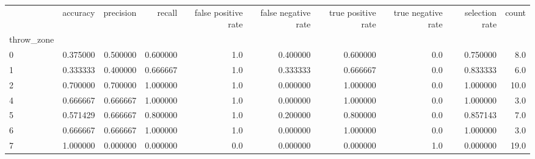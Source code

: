\begin{tabular}{lrrrrrrrrr}
\toprule
{} &  accuracy &  precision &    recall &  false positive rate &  false negative rate &  true positive rate &  true negative rate &  selection rate &  count \\
throw\_zone &           &            &           &                      &                      &                     &                     &                 &        \\
\midrule
0          &  0.375000 &   0.500000 &  0.600000 &                  1.0 &             0.400000 &            0.600000 &                 0.0 &        0.750000 &    8.0 \\
1          &  0.333333 &   0.400000 &  0.666667 &                  1.0 &             0.333333 &            0.666667 &                 0.0 &        0.833333 &    6.0 \\
2          &  0.700000 &   0.700000 &  1.000000 &                  1.0 &             0.000000 &            1.000000 &                 0.0 &        1.000000 &   10.0 \\
4          &  0.666667 &   0.666667 &  1.000000 &                  1.0 &             0.000000 &            1.000000 &                 0.0 &        1.000000 &    3.0 \\
5          &  0.571429 &   0.666667 &  0.800000 &                  1.0 &             0.200000 &            0.800000 &                 0.0 &        0.857143 &    7.0 \\
6          &  0.666667 &   0.666667 &  1.000000 &                  1.0 &             0.000000 &            1.000000 &                 0.0 &        1.000000 &    3.0 \\
7          &  1.000000 &   0.000000 &  0.000000 &                  0.0 &             0.000000 &            0.000000 &                 1.0 &        0.000000 &   19.0 \\
\bottomrule
\end{tabular}
